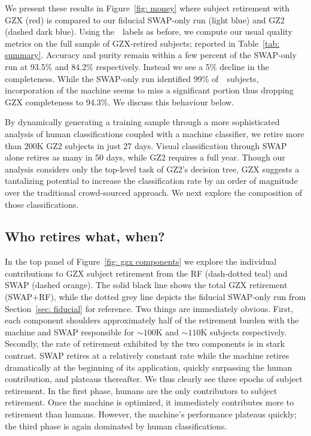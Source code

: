 We present these results in Figure~\ref{fig: money} where subject retirement 
with GZX (red) is compared to our fiducial SWAP-only run (light blue) and GZ2 (dashed dark blue). 
Using the~\raw~labels as before, we compute our usual quality metrics on the 
full sample of GZX-retired subjects; reported in Table~\ref{tab: summary}. 
Accuracy and purity remain within a few percent of the SWAP-only run at 93.5\% 
and 84.2\% respectively. Instead we see a 5\% decline in the completeness. 
While the SWAP-only run identified 99\% of~\feat~subjects, incorporation
of the machine seems to miss a significant portion thus dropping GZX completeness to 94.3\%. 
We discuss this behaviour below.

By dynamically generating a training sample through a more sophisticated analysis of 
human classifications coupled with a machine classifier, we retire more than 200K 
GZ2 subjects in just 27 days.  Visual classification through SWAP alone retires as 
many in 50 days, while GZ2 requires a full year.  
Though our analysis considers only the top-level task of GZ2's decision tree, GZX suggests a tantalizing potential to increase the classification rate by an order of magnitude over the traditional crowd-sourced approach.
We next explore the composition of those classifications.



\subsection{Who retires what, when?}  

In the top panel of Figure~\ref{fig: gzx components} we explore the individual 
contributions to GZX subject retirement from the RF (dash-dotted teal) 
and SWAP (dashed orange). The solid black line shows the total GZX retirement (SWAP+RF), while the dotted grey line depicts the fiducial SWAP-only run from 
Section~\ref{sec: fiducial} for reference. 
Two things are immediately obvious. First, each component shoulders approximately
half of the retirement burden with the machine and SWAP responsible for 
$\sim$$100$K and $\sim$$110$K subjects respectively.  
Secondly, the rate of retirement exhibited by the two components is in stark contrast.
SWAP retires at a relatively constant rate while the machine retires 
dramatically at the beginning of its application, quickly surpassing the human 
contribution, and plateaus thereafter. 
We thus clearly see three epochs of subject retirement.
In the first phase, humans are the only contributors to subject retirement.  
Once the machine is optimized, it immediately contributes more to retirement than humans.
However, the machine's performance plateaus quickly;  the third 
phase is again dominated by human classifications.

